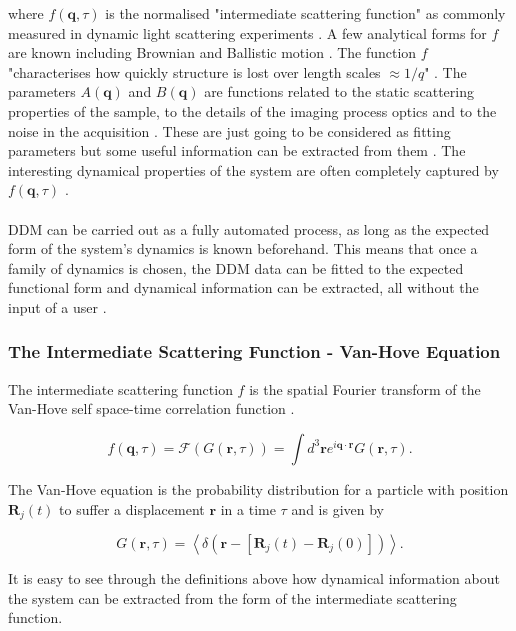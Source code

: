 \documentclass[10pt]{article}
\begin{document}
where $f(\textbf{q}, \tau)$ is the normalised "intermediate scattering function" as commonly measured in dynamic light scattering experiments \cite{DLSPecora}. A few analytical forms for $f$ are known including Brownian and Ballistic motion \cite{DLSPecora}. The function $f$ "characterises how quickly structure is lost over length scales $\approx 1/q$" \cite{ddm1}. The parameters $A(\textbf{q})$ and $B(\textbf{q})$ are functions related to the static scattering properties of the sample, to the details of the imaging process optics and to the noise in the acquisition \cite{ddm1}. These are just going to be considered as fitting parameters but some useful information can be extracted from them \cite{ddm1}. The interesting dynamical properties of the system are often completely captured by $f(\textbf{q}, \tau)$ \cite{ddm1}.
\\\\
DDM can be carried out as a fully automated process, as long as the expected form of the system's dynamics is known beforehand. This means that once a family of dynamics is chosen, the DDM data can be fitted to the expected functional form and dynamical information can be extracted, all without the input of a user \cite{ddm1}.

\subsubsection{The Intermediate Scattering Function - Van-Hove Equation}
The intermediate scattering function $f$ is the spatial Fourier transform of the Van-Hove self space-time correlation function \cite{DLSPecora}.

\begin{equation}
	f(\textbf{q}, \tau) = \mathscr{F} (G(\textbf{r}, \tau)) = \int d^3 \textbf{r} e^{i \textbf{q} \cdot \textbf{r}} G(\textbf{r}, \tau).
\end{equation}

The Van-Hove equation is the probability distribution for a particle with position $\textbf{R}_j(t)$ to suffer a displacement $\textbf{r}$ in a time $\tau$ \cite{DLSPecora} and is given by

\begin{equation}
	G(\textbf{r}, \tau) = \left\langle \delta (\textbf{r} - [\textbf{R}_j(t) - \textbf{R}_j(0)]) \right\rangle.
\end{equation}

It is easy to see through the definitions above how dynamical information about the system can be extracted from the form of the intermediate scattering function.
\end{document}
